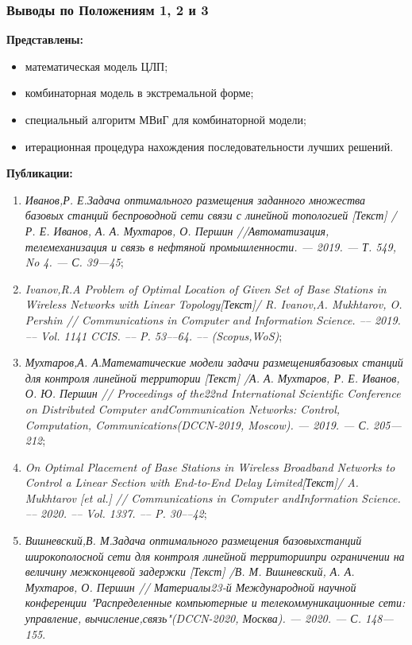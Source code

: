 \begin{frame}
    \frametitle{Выводы по Положениям 1, 2 и 3}
    \fontsize{8pt}{7.2}\selectfont

    \textbf{Представлены:}
    \begin{itemize}
        \item математическая модель ЦЛП;
        \item комбинаторная модель в экстремальной форме;
        \item специальный алгоритм МВиГ для комбинаторной модели;
        \item итерационная процедура нахождения последовательности лучших решений.
    \end{itemize}

    \bigskip
    \textbf{Публикации:}
    \begin{minipage}[c]{1\linewidth}
        \fontsize{6pt}{7.2}\selectfont
        \begin{enumerate}
            \item \textit{Иванов,Р. Е.Задача оптимального размещения заданного множе­ства базовых станций беспроводной сети связи с линейной топо­логией [Текст] / Р. Е. Иванов, А. А. Мухтаров, О. Першин //Автоматизация, телемеханизация и связь в нефтяной промышлен­ности. — 2019. — Т. 549, No 4. — С. 39—45};
            
            \item \textit{Ivanov,R.A Problem of Optimal Location of Given Set of Base Sta­tions in Wireless Networks with Linear Topology[Текст]/ R. Ivanov,A. Mukhtarov, O. Pershin // Communications in Computer and Infor­mation Science. –– 2019. –– Vol. 1141 CCIS. –– P. 53––64. –– (Scopus,WoS)};
            
            \item \textit{Мухтаров,А. А.Математические  модели  задачи  размещениябазовых станций для контроля линейной территории [Текст] /А. А. Мухтаров, Р. Е. Иванов, О. Ю. Першин // Proceedings of the22nd International Scientific Conference on Distributed Computer andCommunication Networks: Control, Computation, Communications(DCCN-2019, Moscow). — 2019. — С. 205—212};
            
            \item \textit{On Optimal Placement of Base Stations in Wireless Broadband Net­works to Control a Linear Section with End-to-End Delay Limited[Текст]/ A. Mukhtarov [et al.] // Communications in Computer andInformation Science. –– 2020. –– Vol. 1337. –– P. 30––42};
            
            \item \textit{{Вишневский,В. М.Задача оптимального размещения базовыхстанций широкополосной сети для контроля линейной территориипри ограничении на величину межконцевой задержки [Текст] /В. М. Вишневский, А. А. Мухтаров, О. Першин // Материалы23-й Международной научной конференции "Распределенные ком­пьютерные и телекоммуникационные сети: управление, вычисление,связь"(DCCN-2020, Москва). — 2020. — С. 148—155}}.
        \end{enumerate}
    \end{minipage}

\end{frame}

